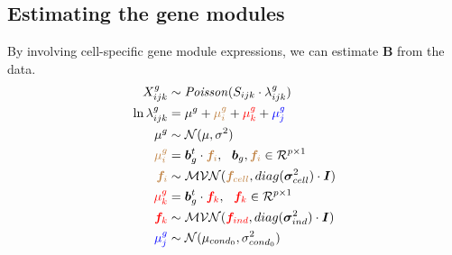 \subsection*{Estimating the gene modules}
\begin{frame}
  By involving cell-specific gene module expressions, we can estimate $\bm{B}$
  from the data.
  \begin{align*}
    X_{ijk}^{g} &\sim {\it Poisson} (S_{ijk}\cdot \lambda_{ijk}^{g})\\
    \ln \lambda_{ijk}^{g} &= \mu^{g} + \textcolor{brown}{\mu_{i}^{g}} + \textcolor{red}{\mu_{k}^{g}} + \textcolor{blue}{\mu_{j}^{g}} \\
    \mu^{g} &\sim \mathcal{N}(\mu, \sigma^{2}) \\
    \textcolor{brown}{\mu_{i}^{g}} &= \bm{b}_{g}^{t} \cdot \textcolor{brown}{\bm{f}_{i}}, ~~\bm{b}_{g},\textcolor{brown}{\bm{f}_{i}}\in \mathcal{R}^{p\times 1}\\
    \textcolor{brown}{\bm{f}_{i}} &\sim \mathcal{MVN}(\textcolor{brown}{\bm{f}_{cell}}, diag(\bm{\sigma}^{2}_{cell})\cdot\bm{I}) \\
    \textcolor{red}{\mu_{k}^{g}} &= \bm{b}_{g}^{t}\cdot \textcolor{red}{\bm{f}_{k}},~~\textcolor{red}{\bm{f}_{k}}\in \mathcal{R}^{p\times 1}\\
    \textcolor{red}{\bm{f}_{k}} &\sim \mathcal{MVN}(\textcolor{red}{\bm{f}_{ind}}, diag(\bm{\sigma}^{2}_{ind})\cdot\bm{I}) \\
    \textcolor{blue}{\mu_{j}^{g}} &\sim \mathcal{N}(\mu_{cond_{0}}, \sigma_{cond_{0}}^{2})
  \end{align*}
\end{frame}
